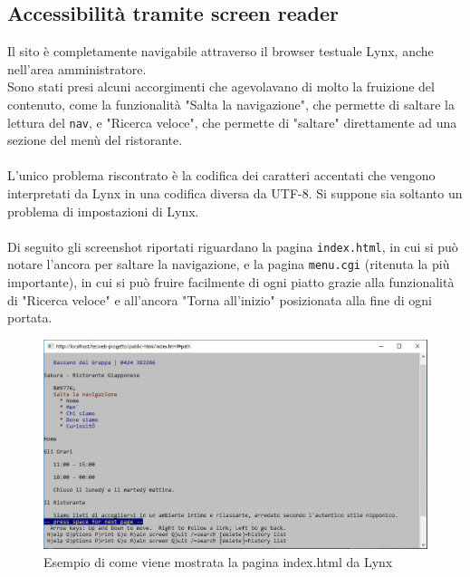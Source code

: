 \documentclass[../relazione.tex]{subfiles}
\begin{document}
	\subsection{Accessibilità tramite screen reader}
		Il sito è completamente navigabile attraverso il browser testuale Lynx, anche nell'area amministratore.\\
		Sono stati presi alcuni accorgimenti che agevolavano di molto la fruizione del contenuto, come la funzionalità "Salta la navigazione", che permette di saltare la lettura del \texttt{nav}, e "Ricerca veloce", che permette di "saltare" direttamente ad una sezione del menù del ristorante.\\\\
		L'unico problema riscontrato è la codifica dei caratteri accentati che vengono interpretati da Lynx in una codifica diversa da UTF-8. Si suppone sia soltanto un problema di impostazioni di Lynx.\\\\
		Di seguito gli screenshot riportati riguardano la pagina \texttt{index.html}, in cui si può notare l'ancora per saltare la navigazione, e la pagina \texttt{menu.cgi} (ritenuta la più importante), in cui si può fruire facilmente di ogni piatto grazie alla funzionalità di "Ricerca veloce" e all'ancora "Torna all'inizio" posizionata alla fine di ogni portata.
		\begin{figure}[H]
			\centering
			\includegraphics[width=\textwidth]{images/lynx1}
			\caption{Esempio di come viene mostrata la pagina index.html da Lynx}
			\label{fig:Esempio di come viene mostrata la pagina index.html da Lynx}
		\end{figure}
\end{document}
